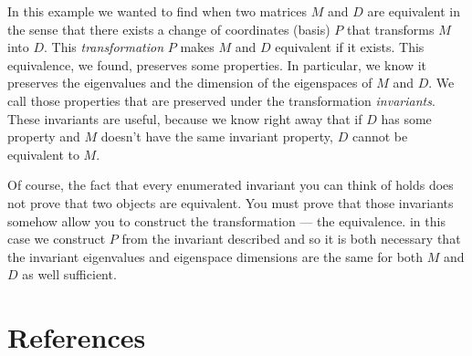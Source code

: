 In this example we wanted to find when two matrices \(M\) and \(D\) are equivalent in the sense that there exists a change of coordinates (basis) \(P\) that transforms \(M\) into \(D.\)
This \emph{transformation} \(P\) makes \(M\) and \(D\) equivalent if it exists.
This equivalence, we found, preserves some properties.
In particular, we know it preserves the eigenvalues and the dimension of the eigenspaces of \(M\) and \(D.\)
We call those properties that are preserved under the transformation \emph{invariants}.
These invariants are useful, because we know right away that if \(D\) has some property and \(M\) doesn't have the same invariant property, \(D\) cannot be equivalent to \(M.\)

Of course, the fact that every enumerated invariant you can think of holds does not prove that two objects are equivalent.
You must prove that those invariants somehow allow you to construct the transformation --- the equivalence.
in this case we construct \(P\) from the invariant described and so it is both necessary that the invariant eigenvalues and eigenspace dimensions are the same for both \(M\) and \(D\) as well sufficient.

\section{References}
\printbibliography


